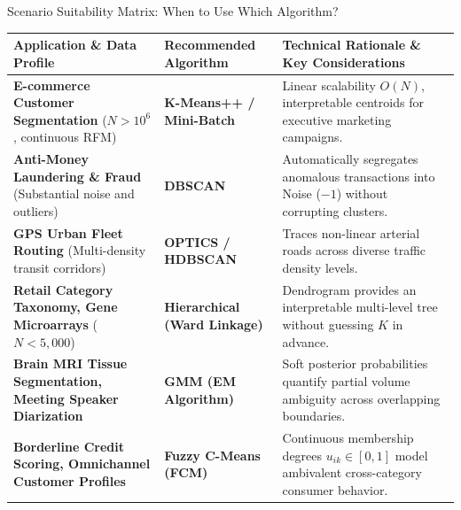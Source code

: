 \documentclass[aspectratio=169,10pt]{beamer}
\begin{document}
\begin{frame}{Scenario Suitability Matrix: When to Use Which Algorithm?}
  \begin{table}[]
    \tiny
    \centering
    \begin{tabularx}{\textwidth}{p{3.2cm} p{2.4cm} X}
      \toprule
      \textbf{Application \& Data Profile} & \textbf{Recommended Algorithm} & \textbf{Technical Rationale \& Key Considerations} \\
      \midrule
      \textbf{E-commerce Customer Segmentation} ($N > 10^6$, continuous RFM) & \textbf{K-Means++ / Mini-Batch} & Linear scalability $O(N)$, interpretable centroids for executive marketing campaigns. \\
      \addlinespace
      \textbf{Anti-Money Laundering \& Fraud} (Substantial noise and outliers) & \textbf{DBSCAN} & Automatically segregates anomalous transactions into Noise ($-1$) without corrupting clusters. \\
      \addlinespace
      \textbf{GPS Urban Fleet Routing} (Multi-density transit corridors) & \textbf{OPTICS / HDBSCAN} & Traces non-linear arterial roads across diverse traffic density levels. \\
      \addlinespace
      \textbf{Retail Category Taxonomy, Gene Microarrays} ($N < 5{,}000$) & \textbf{Hierarchical (Ward Linkage)} & Dendrogram provides an interpretable multi-level tree without guessing $K$ in advance. \\
      \addlinespace
      \textbf{Brain MRI Tissue Segmentation, Meeting Speaker Diarization} & \textbf{GMM (EM Algorithm)} & Soft posterior probabilities quantify partial volume ambiguity across overlapping boundaries. \\
      \addlinespace
      \textbf{Borderline Credit Scoring, Omnichannel Customer Profiles} & \textbf{Fuzzy C-Means (FCM)} & Continuous membership degrees $u_{ik} \in [0, 1]$ model ambivalent cross-category consumer behavior. \\
      \bottomrule
    \end{tabularx}
  \end{table}
\end{frame}
\end{document}
